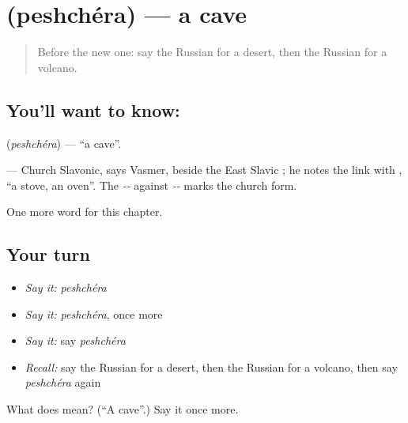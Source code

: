 \section[\texorpdfstring{\ru{пещера} (peshchéra)}{пещера (peshchéra)}]{ (peshchéra) — a cave}

\label{lesson:RU-C116-cave}



\begin{quote}
Before the new one: say the Russian for a desert, then the Russian for a volcano.
\end{quote}

\subsection*{You'll want to know: }
\textbf{} (\emph{peshchéra}) — \textquotedblleft{}a cave\textquotedblright{}.

\begin{cousinweb}
\textbf{} — Church Slavonic, says Vasmer, beside the East Slavic \emph{}; he notes the link with \emph{}, \textquotedblleft{}a stove, an oven\textquotedblright{}. The \emph{--} against \emph{--} marks the church form.
\end{cousinweb}

\begin{grammarlens}[title={What you've built}]
One more word for this chapter.
\end{grammarlens}

\subsection*{Your turn}
\begin{itemize}
\raggedright
  \item \emph{Say it:} \emph{peshchéra}
  \item \emph{Say it:} \emph{peshchéra}, once more
  \item \emph{Say it:} say \emph{peshchéra}
  \item \emph{Recall:} say the Russian for a desert, then the Russian for a volcano, then say \emph{peshchéra} again
\end{itemize}

\begin{tcolorbox}[breakable,colback=teal!4,colframe=teal!35!black,title={Before you move on}]
What does  mean? (\textquotedblleft{}A cave\textquotedblright{}.) Say it once more.
\end{tcolorbox}

